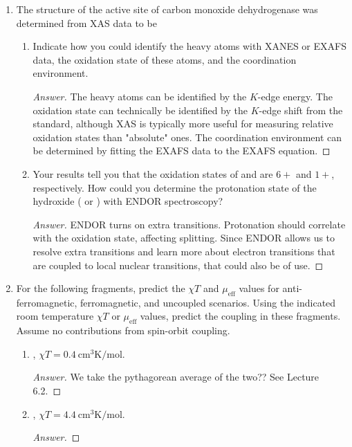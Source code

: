 \documentclass[../psets.tex]{subfiles}
\begin{document}
\begin{enumerate}
\begin{enumerate}
    \end{enumerate}
    \item The structure of the active site of carbon monoxide dehydrogenase was determined from XAS data to be
    \begin{center}
        \footnotesize
    \end{center}
    \begin{enumerate}
        \item Indicate how you could identify the heavy atoms with XANES or EXAFS data, the oxidation state of these atoms, and the coordination environment.
        \begin{proof}[Answer]

            The heavy atoms can be identified by the $K$-edge energy. The oxidation state can technically be identified by the $K$-edge shift from the standard, although XAS is typically more useful for measuring relative oxidation states than "absolute" ones. The coordination environment can be determined by fitting the EXAFS data to the EXAFS equation.
        \end{proof}
        \item Your results tell you that the oxidation states of  and  are $6+$ and $1+$, respectively. How could you determine the protonation state of the hydroxide ( or ) with ENDOR spectroscopy?
        \begin{proof}[Answer]
            ENDOR turns on extra transitions. Protonation should correlate with the oxidation state, affecting splitting. Since ENDOR allows us to resolve extra transitions and learn more about electron transitions that are coupled to local nuclear transitions, that could also be of use.
        \end{proof}
    \end{enumerate}
    \item For the following fragments, predict the $\chi T$ and $\mu_\text{eff}$ values for anti-ferromagnetic, ferromagnetic, and uncoupled scenarios. Using the indicated room temperature $\chi T$ or $\mu_\text{eff}$ values, predict the coupling in these fragments. Assume no contributions from spin-orbit coupling.
    \begin{enumerate}
        \item {}, $\chi T=\SI{0.4}{\centi\meter\cubed\kelvin\per\mole}$.
        \begin{proof}[Answer]
            We take the pythagorean average of the two?? See Lecture 6.2.
        \end{proof}
        \item {}, $\chi T=\SI{4.4}{\centi\meter\cubed\kelvin\per\mole}$.
        \begin{proof}[Answer]
            

\end{proof}
\end{enumerate}
\end{enumerate}
\end{document}
